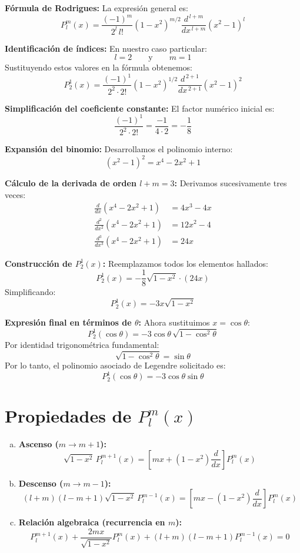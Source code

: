 \documentclass[a4paper]{article}
\begin{document}
\textbf{Fórmula de Rodrigues:}
La expresión general es:
$$
P_l^m(x) = \frac{(-1)^m}{2^l \, l!} (1 - x^2)^{m/2} \frac{d^{\,l+m}}{dx^{\,l+m}} (x^2 - 1)^l
$$

\textbf{Identificación de índices:}
En nuestro caso particular:
$$
l = 2 \qquad \text{y} \qquad m = 1
$$
Sustituyendo estos valores en la fórmula obtenemos:
$$
P_2^1(x) = \frac{(-1)^1}{2^2 \cdot 2!} (1 - x^2)^{1/2} \frac{d^{\,2+1}}{dx^{\,2+1}} (x^2 - 1)^2
$$

\textbf{Simplificación del coeficiente constante:}
El factor numérico inicial es:
$$
\frac{(-1)^1}{2^2 \cdot 2!} = \frac{-1}{4 \cdot 2} = -\frac{1}{8}
$$

\textbf{Expansión del binomio:}
Desarrollamos el polinomio interno:
$$
(x^2 - 1)^2 = x^4 - 2x^2 + 1
$$

\textbf{Cálculo de la derivada de orden $l+m = 3$:}
Derivamos sucesivamente tres veces:
$$
\begin{aligned}
\frac{d}{dx}(x^4 - 2x^2 + 1) &= 4x^3 - 4x \\[2mm]
\frac{d^2}{dx^2}(x^4 - 2x^2 + 1) &= 12x^2 - 4 \\[2mm]
\frac{d^3}{dx^3}(x^4 - 2x^2 + 1) &= 24x
\end{aligned}
$$

\textbf{Construcción de $P_2^1(x)$:}
Reemplazamos todos los elementos hallados:
$$
P_2^1(x) = -\frac{1}{8} \sqrt{1 - x^2} \cdot (24x)
$$
Simplificando:
$$
P_2^1(x) = -3x \sqrt{1 - x^2}
$$

\textbf{Expresión final en términos de $\theta$:}
Ahora sustituimos $x = \cos \theta$:
$$
P_2^1(\cos \theta) = -3 \cos \theta \, \sqrt{1 - \cos^2 \theta}
$$
Por identidad trigonométrica fundamental:
$$
\sqrt{1 - \cos^2 \theta} = \sin \theta
$$
Por lo tanto, el polinomio asociado de Legendre solicitado es:
$$
\boxed{P_2^1(\cos \theta) = -3 \cos \theta \sin \theta}
$$

\section{Propiedades de $P_l^m(x)$}

\begin{enumerate}[a)]
    \item \textbf{Ascenso ($m \to m+1$):}
    $$
    \sqrt{1 - x^2} \, P_l^{m+1}(x) = \left[ m x + (1 - x^2) \frac{d}{dx} \right] P_l^m(x)
    $$
    
    \item \textbf{Descenso ($m \to m-1$):}
    $$
    (l + m)(l - m + 1) \sqrt{1 - x^2} \, P_l^{m-1}(x) = \left[ m x - (1 - x^2) \frac{d}{dx} \right] P_l^m(x)
    $$
    
    \item \textbf{Relación algebraica (recurrencia en $m$):}
    $$
    P_l^{m+1}(x) + \frac{2mx}{\sqrt{1 - x^2}} P_l^m(x) + (l + m)(l - m + 1) P_l^{m-1}(x) = 0
    $$
\end{enumerate}
\end{document}
